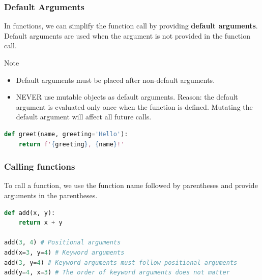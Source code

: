 \documentclass[beamer, en, version=2.0]{huangfusl-template}
\begin{document}
    \begin{frame}[fragile]
        \frametitle{Default Arguments}

        In functions, we can simplify the function call by providing \textbf{default arguments}. Default arguments are used when the argument is not provided in the function call.

        \begin{block}{Note}
            \begin{itemize}
                \item Default arguments must be placed after non-default arguments.
                \item NEVER use mutable objects as default arguments. Reason: the default argument is evaluated only once when the function is defined. Mutating the default argument will affect all future calls.
            \end{itemize}
        \end{block}

\begin{lstlisting}[language=python]
def greet(name, greeting='Hello'):
    return f'{greeting}, {name}!'
\end{lstlisting}
    \end{frame}
    \begin{frame}[fragile]
        \frametitle{Calling functions}

        To call a function, we use the function name followed by parentheses and provide arguments in the parentheses.

\begin{lstlisting}[language=python]
def add(x, y):
    return x + y

add(3, 4) # Positional arguments
add(x=3, y=4) # Keyword arguments
add(3, y=4) # Keyword arguments must follow positional arguments
add(y=4, x=3) # The order of keyword arguments does not matter
\end{lstlisting}
    \end{frame}
\end{document}
